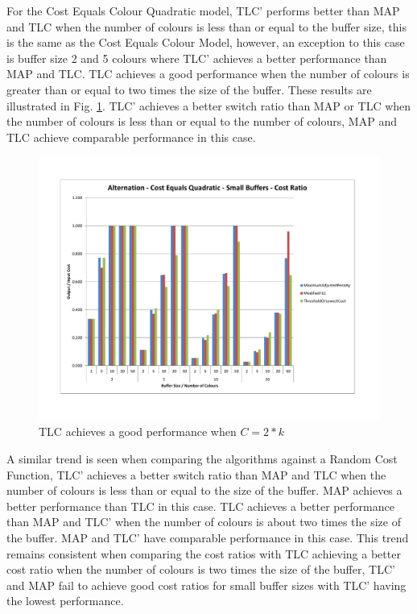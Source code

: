 For the Cost Equals Colour Quadratic model, TLC' performs better than MAP and TLC when the number of colours is less than or equal to the buffer size, this is the same as the Cost Equals Colour Model, however, an exception to this case is buffer size 2 and 5 colours where TLC' achieves a better performance than MAP and TLC. TLC achieves a good performance when the number of colours is greater than or equal to two times the size of the buffer. These results are illustrated in Fig. \ref{alternationCQSmallCost}. TLC' achieves a better switch ratio than MAP or TLC when the number of colours is less than or equal to the number of colours, MAP and TLC achieve comparable performance in this case.

\begin{figure}[ht]
\centering 
\includegraphics[scale=0.60]{Alternation-cq-small-cost.pdf}
\caption{TLC achieves a good performance when $C = 2 * k$}
\label{alternationCQSmallCost}
\end{figure} 

A similar trend is seen when comparing the algorithms against a Random Cost Function, TLC' achieves a better switch ratio than MAP and TLC when the number of colours is less than or equal to the size of the buffer. MAP achieves a better performance than TLC in this case. TLC achieves a better performance than MAP and TLC' when the number of colours is about two times the size of the buffer. MAP and TLC' have comparable performance in this case. This trend remains consistent when comparing the cost ratios with TLC achieving a better cost ratio when the number of colours is two times the size of the buffer, TLC' and MAP fail to achieve good cost ratios for small buffer sizes with TLC' having the lowest performance.  


